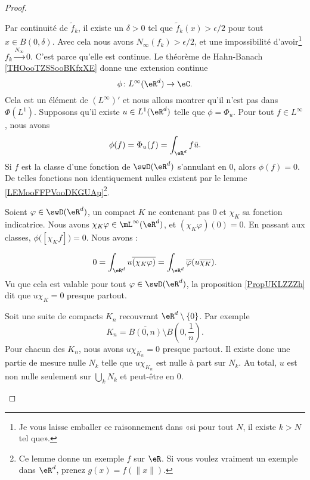 \begin{proof}
\begin{subproof}
    Par continuité de \( \tilde f_k\), il existe un \( \delta>0\) tel que \( \tilde f_k(x)>\epsilon/2\) pour tout \( x\in B(0,\delta)\). Avec cela nous avons \( N_{\infty}(f_k)>\epsilon/2\), et une impossibilité d'avoir\footnote{Je vous laisse emballer ce raisonnement dans «si pour tout \( N\), il existe \( k>N\) tel que».} \( f_k\stackrel{N_{\infty}}{\longrightarrow}0\).
    C'est parce qu'elle est continue.
    Le théorème de Hahn-Banach \ref{THOooTZSSooBKfxXE} donne une extension continue
    \begin{equation}
        \phi\colon L^{\infty}(\eR^d)\to \eC.
    \end{equation}
    Cela est un élément de \( (L^{\infty})'\) et nous allons montrer qu'il n'est pas dans \( \Phi(L^1)\).
    Supposons qu'il existe \( u\in L^1(\eR^d)\) telle que \( \phi=\Phi_u\). Pour tout \( f\in L^{\infty}\), nous avons
    \begin{equation}
        \phi(f)=\Phi_u(f)=\int_{\eR^d}f\bar u.
    \end{equation}
    Si \( f\) est la classe d'une fonction de \( \swD(\eR^d)\) s'annulant en \( 0\), alors \( \phi(f)=0\). De telles fonctions non identiquement nulles existent par le lemme \ref{LEMooFFPVooDKGUAp}\footnote{Ce lemme donne un exemple \( f\) sur \( \eR\). Si vous voulez vraiment un exemple dans \( \eR^d\), prenez \( g(x)=f(\| x \|)\).}.


    Soient \( \varphi\in \swD(\eR^d)\), un compact \( K\) ne contenant pas \( 0\) et \( \chi_K\) sa fonction indicatrice. Nous avons \( \chi_K\varphi\in \mL^{\infty}(\eR^d)\), et \( (\chi_K\varphi)(0)=0\). En passant aux classes, \( \phi\big( [\chi_Kf] \big)=0\). Nous avons :

    \begin{equation}
        0=\int_{\eR^d}u\overline{ (\chi_K\varphi) }=\int_{\eR^d}\overline{ \varphi }(u\overline{ \chi_K }).
    \end{equation}
    Vu que cela est valable pour tout \( \varphi\in \swD(\eR^d)\), la proposition \ref{PropUKLZZZh} dit que \( u\chi_K=0\) presque partout.


    Soit une suite de compacts \( K_n\) recouvrant \( \eR^d\setminus\{ 0 \}\). Par exemple
    \begin{equation}
        K_n=\overline{ B(0,n) }\setminus B(0,\frac{1}{ n }).
    \end{equation}
    Pour chacun des \( K_n\), nous avons \( u\chi_{K_n}=0\) presque partout. Il existe donc une partie de mesure nulle \( N_k\) telle que \( u\chi_{K_n}\) est nulle à part sur \( N_k\). Au total, \( u\) est non nulle seulement sur \( \bigcup_{k}N_k\) et peut-être en \( 0\).


\end{subproof}
\end{proof}
